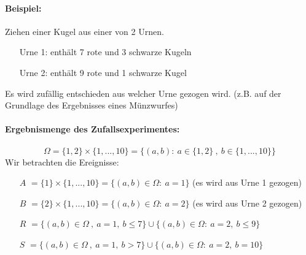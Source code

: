 \documentclass[12pt,a4paper]{article}
\begin{document}
	\paragraph{Beispiel:}
	\label{defBedingteWS}
	Ziehen einer Kugel aus einer von 2 Urnen.
	\begin{itemize}
	\item[Urne 1:] enthält 7 rote und 3 schwarze Kugeln
	\item[Urne 2:] enthält 9 rote und 1 schwarze Kugel
	\end{itemize}	 	
 	Es wird zufällig entschieden aus welcher Urne gezogen wird. (z.B. auf der Grundlage des Ergebnisses eines Münzwurfes)
 	\paragraph{Ergebnismenge des Zufallsexperimentes:}
 	$$\Omega=\{1,2\}\times\{1,...,10\}=\{(a,b):\: a\in\{1,2\} \: , \: b\in\{1,...,10\}\}$$
 	Wir betrachten die Ereignisse:
 	\begin{itemize}
 	\item[$A$] $=\{1\}\times\{1,...,10\}=\{(a,b)\in\Omega:\: a=1\}$ (es wird aus Urne 1 gezogen)
 	\item[$B$] $=\{2\}\times\{1,...,10\}=\{(a,b)\in\Omega:\: a=2\}$ (es wird aus Urne 2 gezogen)
 	\item[$R$] $=\{(a,b)\in\Omega\: ,\: a=1,\: b\leq 7\}\cup\{(a,b)\in\Omega:\: a=2,\: b\leq 9\}$
 	\item[$S$] $=\{(a,b)\in\Omega\: ,\: a=1,\: b>7 \}\cup\{(a,b)\in\Omega:\: a=2,\: b=10\}$ 
 	\end{itemize}
\end{document}
